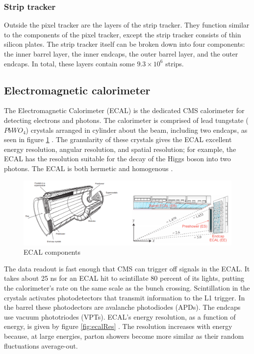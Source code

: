 \subsubsection{Strip tracker}

Outside the pixel tracker are the layers of the strip tracker. They function similar to the components of the pixel tracker, except the strip tracker consists of thin silicon plates. The strip tracker itself can be broken down into four components: the inner barrel layer, the inner endcaps, the outer barrel layer, and the outer endcaps. In total, these layers contain some $9.3 \times 10^6$ strips. 

\subsection{Electromagnetic calorimeter}

The Electromagnetic Calorimeter (ECAL) is the dedicated CMS calorimeter for detecting electrons and photons. The calorimeter is comprised of lead tungstate ($PbWO_4$) crystals arranged in cylinder about the beam, including two endcaps, as seen in figure \ref{fig:ecalComp} \cite{Benaglia:2014aqa}. The granularity of these crystals gives the ECAL excellent energy resolution, angular resolution, and spatial resolution; for example, the ECAL has the resolution suitable for the decay of the Higgs boson into two photons. The ECAL is both hermetic and homogenous \cite{elect_cms_note06}. 

\begin{figure}[h!]
\begin{centering}
\includegraphics[width=7in]{Chapter3/importfigs/ecal_performance_with_examples.png}
\par\end{centering}
\caption{ECAL components \cite{Benaglia:2014aqa} \label{fig:ecalComp}}
\end{figure}

The data readout is fast enough that CMS can trigger off signals in the ECAL. It takes about 25 ns for an ECAL hit to scintillate 80 percent of its lights, putting the calorimeter's rate on the same scale as the bunch crossing. Scintillation in the crystals activates photodetectors that transmit information to the L1 trigger. In the barrel these photodectors are avalanche photodiodes (APDs). The endcaps use vacuum phototriodes (VPTs). ECAL's energy resolution, as a function of energy, is given by figure \ref{fig:ecalRes} \cite{Bayatian:2006nff}. The resolution increases with energy because, at large energies, parton showers become more similar as their random fluctuations average-out.

